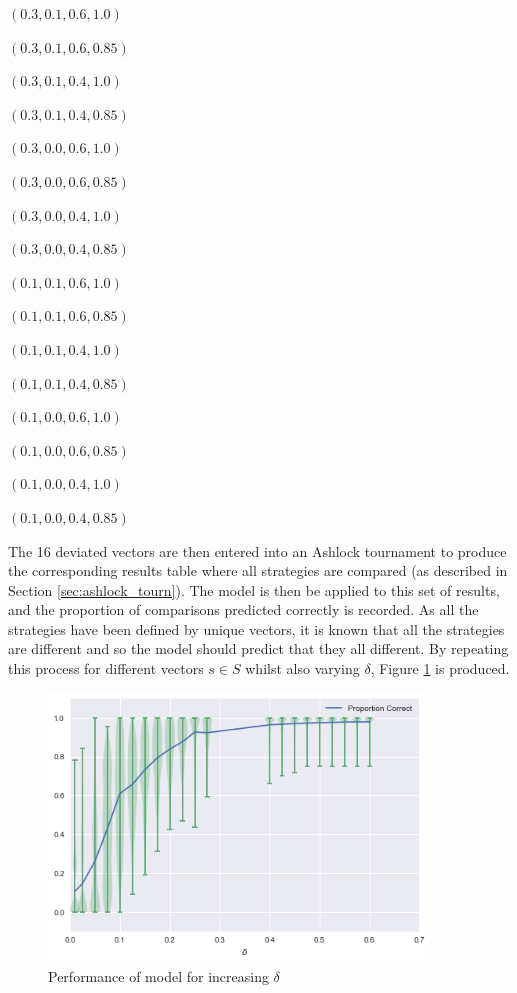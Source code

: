 \begin{itemize}
\begin{multicols}{4}
  \item $(0.3, 0.1, 0.6, 1.0)$
  \item $(0.3, 0.1, 0.6, 0.85)$
  \item $(0.3, 0.1, 0.4, 1.0)$
  \item $(0.3, 0.1, 0.4, 0.85)$
  \item $(0.3, 0.0, 0.6, 1.0)$
  \item $(0.3, 0.0, 0.6, 0.85)$
  \item $(0.3, 0.0, 0.4, 1.0)$
  \item $(0.3, 0.0, 0.4, 0.85)$
  \item $(0.1, 0.1, 0.6, 1.0)$
  \item $(0.1, 0.1, 0.6, 0.85)$
  \item $(0.1, 0.1, 0.4, 1.0)$
  \item $(0.1, 0.1, 0.4, 0.85)$
  \item $(0.1, 0.0, 0.6, 1.0)$
  \item $(0.1, 0.0, 0.6, 0.85)$
  \item $(0.1, 0.0, 0.4, 1.0)$
  \item $(0.1, 0.0, 0.4, 0.85)$
\end{multicols}
\end{itemize}

The 16 deviated vectors are then entered into an Ashlock tournament to produce the corresponding results table where all strategies are compared (as described in Section \ref{sec:ashlock_tourn}).
The model is then be applied to this set of results, and the proportion of comparisons predicted correctly is recorded.
As all the strategies have been defined by unique vectors, it is known that all the strategies are different and so the model should predict that they all different.
By repeating this process for different vectors $s \in S$ whilst also varying $\delta$, Figure \ref{fig:m1_correct} is produced.

\begin{figure}[htbp!]
    \centering
    \includegraphics[width=0.9\textwidth]{../img/ML/proportion-correct.png}
    \caption{Performance of model for increasing $\delta$}
    \label{fig:m1_correct}
\end{figure}

